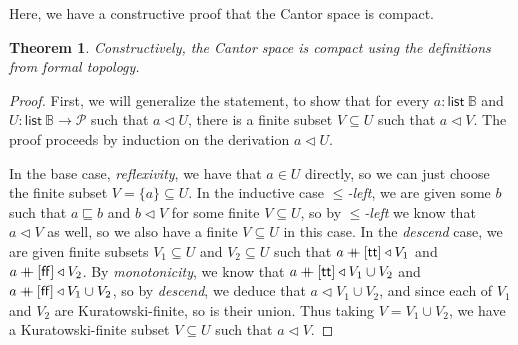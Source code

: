 \documentclass{article}           %
\newtheorem{theorem}{Theorem}
\newcommand{\Prop}{\mathcal{P}}
\newcommand{\bool}{\mathbb{B}}
\newcommand{\List}[1]{\mathsf{list}\ {#1}}
\newcommand{\cat}{\ensuremath{\mathbin{+\mkern-10mu+}}}
\newcommand{\cov}{\triangleleft}
\begin{document}
Here, we have a constructive proof that the Cantor space is compact. 
\begin{theorem}
Constructively, the Cantor space is compact using the definitions from formal topology.
\end{theorem}
\begin{proof}
First, we will generalize the statement, to show that for every $a : \List{\bool}$ and $U : \List{\bool} \to \Prop$ such that $a \cov U$, there is a finite subset $V \subseteq U$ such that $a \cov V$. The proof proceeds by induction on the derivation $a \cov U$.

In the base case, \emph{reflexivity}, we have that $a \in U$ directly, so we can just choose the finite subset $V = \{ a \} \subseteq U$. In the inductive case \emph{$\le$-left}, we are given some $b$ such that $a \sqsubseteq b$ and $b \cov V$ for some finite $V \subseteq U$, so by \emph{$\le$-left} we know that $a \cov V$ as well, so we also have a finite $V \subseteq U$ in this case. In the \emph{descend} case, we are given finite subsets $V_1 \subseteq U$ and $V_2 \subseteq U$ such that $a \cat [\mathsf{tt}] \cov V_1$ and $a \cat [\mathsf{ff}] \cov V_2$. By \emph{monotonicity}, we know that $a \cat [\mathsf{tt}] \cov V_1 \cup V_2$ and $a \cat [\mathsf{ff}] \cov V_1 \cup V_2$, so by \emph{descend}, we deduce that $a \cov V_1 \cup V_2$, and since each of $V_1$ and $V_2$ are Kuratowski-finite, so is their union. Thus taking $V = V_1 \cup V_2$, we have a Kuratowski-finite subset $V \subseteq U$ such that $a \cov V$.
\end{proof}
\end{document}
